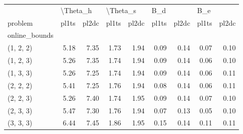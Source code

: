 \begin{tabular}{lrrrrrrrr}
\toprule
{} & \multicolumn{2}{l}{\textbackslash Theta\_h} & \multicolumn{2}{l}{\textbackslash Theta\_s} & \multicolumn{2}{l}{B\_d} & \multicolumn{2}{l}{B\_e} \\
problem &    pl1ts & pl2dc &    pl1ts & pl2dc & pl1ts & pl2dc & pl1ts & pl2dc \\
online\_bounds &          &       &          &       &       &       &       &       \\
\midrule
(1, 2, 2)     &     5.18 &  7.35 &     1.73 &  1.94 &  0.09 &  0.14 &  0.07 &  0.10 \\
(1, 2, 3)     &     5.26 &  7.35 &     1.74 &  1.94 &  0.09 &  0.14 &  0.06 &  0.10 \\
(1, 3, 3)     &     5.26 &  7.25 &     1.74 &  1.94 &  0.09 &  0.14 &  0.06 &  0.11 \\
(2, 2, 2)     &     5.41 &  7.25 &     1.76 &  1.94 &  0.08 &  0.14 &  0.06 &  0.11 \\
(2, 2, 3)     &     5.26 &  7.40 &     1.74 &  1.95 &  0.09 &  0.14 &  0.07 &  0.10 \\
(2, 3, 3)     &     5.47 &  7.30 &     1.76 &  1.94 &  0.07 &  0.13 &  0.05 &  0.10 \\
(3, 3, 3)     &     6.44 &  7.45 &     1.86 &  1.95 &  0.15 &  0.14 &  0.11 &  0.11 \\
\bottomrule
\end{tabular}
